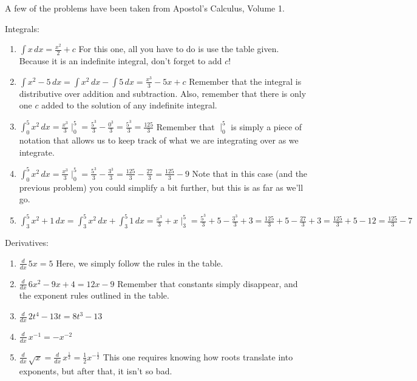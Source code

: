 A few of the problems have been taken from Apostol's Calculus, Volume 1.

Integrals: 
\begin{enumerate}
\item $\int x \, dx = \frac{x^2}{2}+c$ For this one, all you have to do is use the table given. 
Because it is an indefinite integral, don't forget to add $c$!
\item $\int x^2 - 5 \,dx = \int x^2 \, dx - \int 5 \, dx = \frac{x^3}{3}-5x + c$ Remember that the integral is distributive over addition and subtraction. 
Also, remember that there is only one $c$ added to the solution of any indefinite integral.
\item $\int^5_0 x^2 \, dx = \frac{x^3}{3}\mid^5_0 = \frac{5^3}{3}-\frac{0^3}{3}=\frac{5^3}{3}=\frac{125}{3}$ Remember that $\mid^5_0$ is simply a piece of notation that allows us to keep track of what we are integrating over as we integrate.
\item $\int^5_0 x^2 \, dx = \frac{x^3}{3}\mid^5_0 = \frac{5^3}{3}-\frac{3^3}{3} = \frac{125}{3} - \frac{27}{3} = \frac{125}{3}-9$ Note that in this case (and the previous problem) you could simplify a bit further, but this is as far as we'll go.
\item $\int^5_3 x^2 + 1\, dx = \int^5_3 x^2 \, dx + \int^5_3 1 \, dx = \frac{x^3}{3}+x\mid^5_3 = \frac{5^3}{3}+5 - \frac{3^3}{3}+3 = \frac{125}{3}+5 - \frac{27}{3}+3 = \frac{125}{3}+5 - 12 = \frac{125}{3}-7$
\end{enumerate}

Derivatives:
\begin{enumerate}
\item $\frac{d}{dx} \, 5x = 5$ Here, we simply follow the rules in the table.
\item $\frac{d}{dx} \, 6x^2 - 9x + 4 = 12x - 9$ Remember that constants simply disappear, and the exponent rules outlined in the table.
\item $\frac{d}{dx} \, 2t^4 - 13t = 8t^3 - 13$
\item $\frac{d}{dx}\, x^{-1} = -x^{-2}$ 
\item $\frac{d}{dx}\, \sqrt{x} = \frac{d}{dx}\, x^{\frac{1}{2}} = \frac{1}{2}x^{-\frac{1}{2}}$ This one requires knowing how roots translate into exponents, but after that, it isn't so bad.
\end{enumerate}

